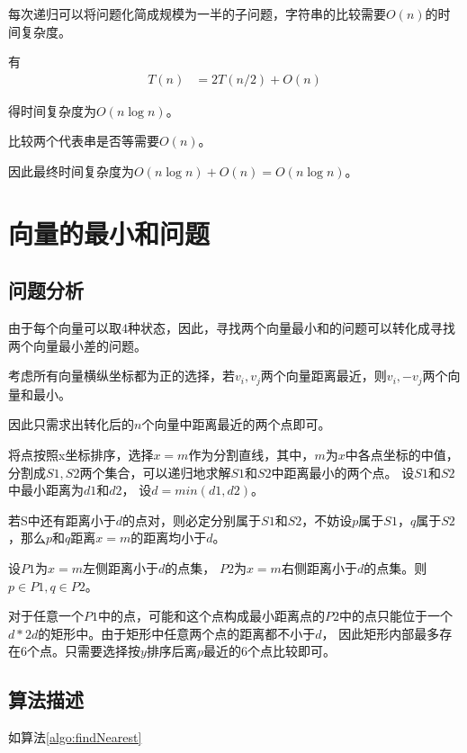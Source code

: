 每次递归可以将问题化简成规模为一半的子问题，字符串的比较需要$O(n)$的时间复杂度。

有
\begin{equation}
    \begin{aligned}
        T(n) &=2T(n/2)+O(n)
    \end{aligned}
    \nonumber
\end{equation}

得时间复杂度为$O(n \log n)$。

比较两个代表串是否等需要$O(n)$。

因此最终时间复杂度为$O(n \log n) + O(n) = O(n \log n)$。


\section{向量的最小和问题}

\subsection*{问题分析}
由于每个向量可以取4种状态，因此，寻找两个向量最小和的问题可以转化成寻找两个向量最小差的问题。

考虑所有向量横纵坐标都为正的选择，若$v_{i}, v_{j}$两个向量距离最近，则$v_{i}, -v_{j}$两个向量和最小。

因此只需求出转化后的$n$个向量中距离最近的两个点即可。

将点按照x坐标排序，选择$x=m$作为分割直线，其中，$m$为$x$中各点坐标的中值，分割成$S1,S2$两个集合，可以递归地求解$S1$和$S2$中距离最小的两个点。
设$S1$和$S2$中最小距离为$d1$和$d2$， 设$d=min(d1,d2)$。

若S中还有距离小于$d$的点对，则必定分别属于$S1$和$S2$，不妨设$p$属于$S1$，$q$属于$S2$，那么$p$和$q$距离$x=m$的距离均小于$d$。

设$P1$为$x=m$左侧距离小于$d$的点集， $P2$为$x=m$右侧距离小于$d$的点集。则 $p \in P1, q \in P2$。

对于任意一个$P1$中的点，可能和这个点构成最小距离点的$P2$中的点只能位于一个 $d * 2d$的矩形中。由于矩形中任意两个点的距离都不小于$d$，
因此矩形内部最多存在6个点。只需要选择按$y$排序后离$p$最近的6个点比较即可。


\subsection*{算法描述}

如算法\ref{algo:findNearest}

